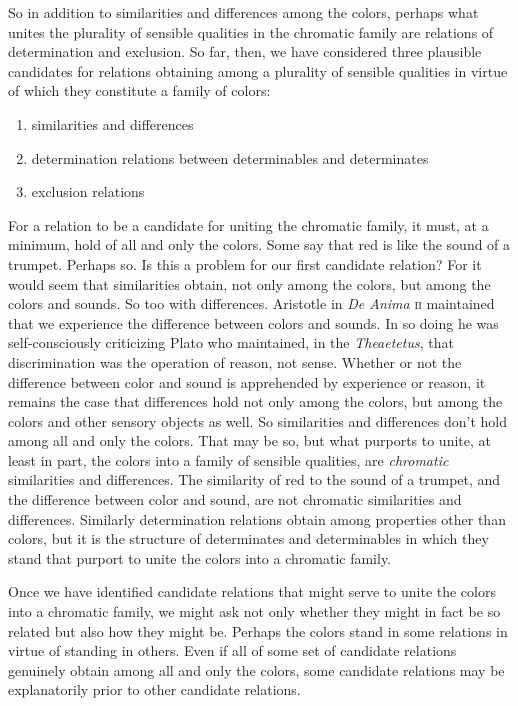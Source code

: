 \documentclass[12pt]{article}
\begin{document}
So in addition to similarities and differences among the colors, perhaps what unites the plurality of sensible qualities in the chromatic family are relations of determination and exclusion. So far, then, we have considered three plausible candidates for relations obtaining among a plurality of sensible qualities in virtue of which they constitute a family of colors:
\begin{enumerate}
	\item similarities and differences
	\item determination relations between determinables and determinates
	\item exclusion relations
\end{enumerate}
For a relation to be a candidate for uniting the chromatic family, it must, at a minimum, hold of all and only the colors. Some say that red is like the sound of a trumpet. Perhaps so. Is this a problem for our first candidate relation? For it would seem that similarities obtain, not only among the colors, but among the colors and sounds. So too with differences. Aristotle in \emph{De Anima} \textsc{ii} maintained that we experience the difference between colors and sounds. In so doing he was self-consciously criticizing Plato who maintained, in the \emph{Theaetetus}, that discrimination was the operation of reason, not sense. Whether or not the difference between color and sound is apprehended by experience or reason, it remains the case that differences hold not only among the colors, but among the colors and other sensory objects as well. So similarities and differences don't hold among all and only the colors. That may be so, but what purports to unite, at least in part, the colors into a family of sensible qualities, are \emph{chromatic} similarities and differences. The similarity of red to the sound of a trumpet, and the difference between color and sound, are not chromatic similarities and differences. Similarly determination relations obtain among properties other than colors, but it is the structure of determinates and determinables in which they stand that purport to unite the colors into a chromatic family.

Once we have identified candidate relations that might serve to unite the colors into a chromatic family, we might ask not only whether they might in fact be so related but also how they might be. Perhaps the colors stand in some relations in virtue of standing in others. Even if all of some set of candidate relations genuinely obtain among all and only the colors, some candidate relations may be explanatorily prior to other candidate relations.
\end{document}
